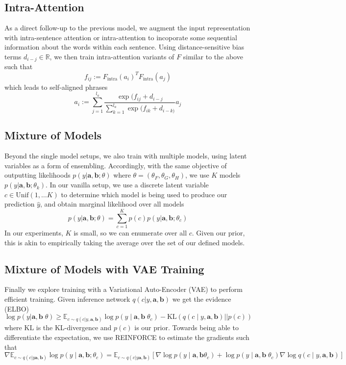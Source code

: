 \documentclass[11pt]{article}
\begin{document}
\subsection{Intra-Attention}
As a direct follow-up to the previous model, we augment the input representation with intra-sentence attention or intra-attention to incoporate some sequential information about the words within each sentence. Using distance-sensitive bias terms $d_{i-j} \in \mathbb{R}$, we then train intra-attention variants of $F$ similar to the above such that
\[
f_{ij} := F_{\text{intra}}(a_i)^T F_{\text{intra}}(a_j)
\]
which leads to self-aligned phrases
\[
a_{i} := \sum_{j=1}^{l_a} \frac{\exp(f_{ij} + d_{i-j}}{\sum_{k=1}^{l_a} \exp(f_{ik} + d_{i-k)}} a_j
\]

\subsection{Mixture of Models}
Beyond the single model setups, we also train with multiple models, using latent variables as a form of ensembling. Accordingly, with the same objective of outputting likelihoods $p(y | \mathbf{a}, \mathbf{b}; \theta)$ where $\theta = (\theta_F, \theta_G, \theta_H)$, we use $K$ models $p(y | \mathbf{a}, \mathbf{b}; \theta_k)$. In our vanilla setup, we use a discrete latent variable $c \in \text{Unif}(1, \ldots K)$ to determine which model is being used to produce our prediction $\hat{y}$, and obtain marginal likelihood over all models 
\[
p(y| \mathbf{a}, \mathbf{b}; \theta) = \sum_{c=1}^K p(c) p(y | \mathbf{a}, \mathbf{b}; \theta_c)
\]
In our experiments, $K$ is small, so we can enumerate over all $c$. Given our prior, this is akin to empirically taking the average over the set of our defined models.

\subsection{Mixture of Models with VAE Training}
Finally we explore training with a Variational Auto-Encoder (VAE) to perform efficient training. Given inference network $q(c | y, \mathbf{a}, \mathbf{b})$ we get the evidence (ELBO)
\[
\log p(y | \mathbf{a}, \mathbf{b} \; \theta) \geq \mathbb{E}_{c \sim q(c | y, \mathbf{a}, \mathbf{b})} \log p(y \mid \mathbf{a}, \mathbf{b}\; \theta_c) - \text{KL}(q(c \mid y, \mathbf{a}, \mathbf{b}) || p(c))
\]
where $\text{KL}$ is the KL-divergence and $p(c)$ is our prior. Towards being able to differentiate the expectation, we use REINFORCE \citep{NIPS1999_1713} to estimate the gradients such that
\[
\nabla \mathbb{E}_{c \sim q(c | y \mathbf{a}, \mathbf{b})} \log p(y \mid \mathbf{a}, \mathbf{b}; \theta_c) = \mathbb{E}_{c \sim q(c | y \mathbf{a}, \mathbf{b})} \left[ \nabla \log p(y \mid \mathbf{a}, \mathbf{b} \theta_c) + \log p(y \mid \mathbf{a}, \mathbf{b} \; \theta_c) \nabla \log q(c \mid y, \mathbf{a}, \mathbf{b}) \right]
\]
\end{document}
